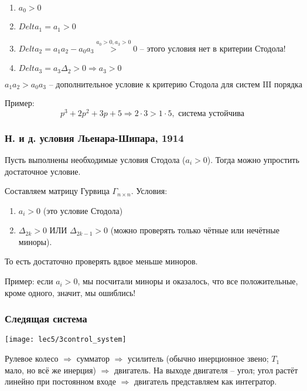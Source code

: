 \documentclass[main.tex]{subfiles}
\begin{document}
\begin{enumerate}[noitemsep]
	\item $ a_0 > 0 $
	\item $ Delta_1 = a_1 > 0 $
	\item $ Delta_2 = a_1 a_2 - a_0 a_3 \overset{a_0 > 0, a_3 > 0} > 0 $ -- этого условия нет в критерии Стодола!
	\item $ Delta_3 = a_3 \Delta_2 > 0 \Rightarrow a_3 > 0 $
\end{enumerate}

$$ \boxed{a_1 a_2 > a_0 a_3} \text{ -- дополнительное условие к критерию Стодола для систем III порядка} $$

Пример:
$$ p^3 + 2 p^2 + 3p + 5 \Rightarrow 2 \cdot 3 > 1 \cdot 5, \text{ система устойчива} $$

\subsubsection{Н. и д. условия Льенара-Шипара, 1914}

Пусть выполнены необходимые условия Стодола ($ a_i > 0 $).
Тогда можно упростить достаточное условие.

Составляем матрицу Гурвица $ \Gamma_{n \times n}  $.
Условия:

\begin{enumerate}[noitemsep]
	\item $ a_i > 0 $ (это условие Стодола)
	\item $ \Delta_{2k} > 0 $ ИЛИ $ \Delta_{2k-1} > 0 $ (можно проверять только чётные или нечётные миноры).
\end{enumerate}

То есть достаточно проверять вдвое меньше миноров.

Пример: если $ a_i > 0 $, мы посчитали миноры и оказалось, что все положительные, кроме одного, значит, мы ошиблись!

\subsubsection{Следящая система}

\texttt{[image: lec5/3control\_system]}

Рулевое колесо $ \Rightarrow $ сумматор $ \Rightarrow $ усилитель (обычно инерционное звено; $T_1$ мало, но всё же инерция) $ \Rightarrow $ двигатель.
На выходе двигателя -- угол; угол растёт линейно при постоянном входе $ \Rightarrow $ двигатель представляем как интегратор.
\end{document}
